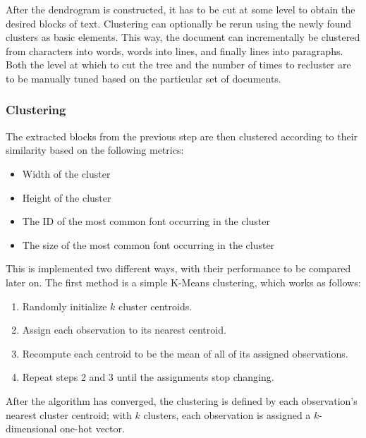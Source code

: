 After the dendrogram is constructed, it has to be cut at some level to obtain
the desired blocks of text. Clustering can optionally be rerun using the newly
found clusters as basic elements. This way, the document can incrementally be
clustered from characters into words, words into lines, and finally lines into
paragraphs. Both the level at which to cut the tree and the number of times to
recluster are to be manually tuned based on the particular set of documents.

\subsubsection{Clustering}
The extracted blocks from the previous step are then clustered according to
their similarity based on the following metrics:
\begin{itemize}
  \item Width of the cluster
  \item Height of the cluster
  \item The ID of the most common font occurring in the cluster
  \item The size of the most common font occurring in the cluster
\end{itemize}
This is implemented two different ways, with their performance to be compared
later on. The first method is a simple K-Means clustering, which works
as follows:
\begin{enumerate}
  \item Randomly initialize $k$ cluster centroids.
  \item Assign each observation to its nearest centroid.
  \item Recompute each centroid to be the mean of all of its assigned
    observations.
  \item Repeat steps 2 and 3 until the assignments stop changing.
\end{enumerate}
After the algorithm has converged, the clustering is defined by each
observation's nearest cluster centroid; with $k$ clusters, each observation is
assigned a $k$-dimensional one-hot vector.

